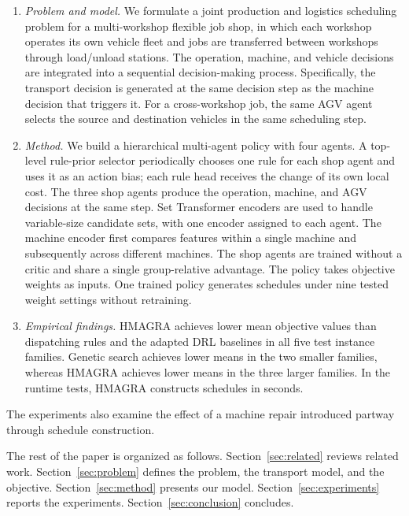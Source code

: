 \begin{enumerate}
\item \emph{Problem and model.} We formulate a joint production and logistics
scheduling problem for a multi-workshop flexible job shop, in which each
workshop operates its own vehicle fleet and jobs are transferred between
workshops through load/unload stations. The operation, machine, and vehicle
decisions are integrated into a sequential decision-making process.
Specifically, the transport decision is generated at the same decision step as
the machine decision that triggers it. For a cross-workshop job, the same AGV
agent selects the source and destination vehicles in the same scheduling step.

\item \emph{Method.} We build a hierarchical multi-agent policy with four
agents. A top-level rule-prior selector periodically chooses one rule for each
shop agent and uses it as an action bias; each rule head receives the change of
its own local cost. The three shop agents produce the operation, machine, and
AGV decisions at the same step. Set Transformer encoders are used to handle
variable-size candidate sets, with one encoder assigned to each agent. The
machine encoder first compares features within a single machine and
subsequently across different machines. The shop agents are trained without a
critic and share a single group-relative advantage. The policy takes objective weights as inputs. One trained policy generates
schedules under nine tested weight settings without retraining.

\item \emph{Empirical findings.} HMAGRA achieves lower mean objective values
than dispatching rules and the adapted DRL baselines in all five test
instance families. Genetic search achieves lower means in the two smaller
families, whereas HMAGRA achieves lower means in the three larger families.
In the runtime tests, HMAGRA constructs schedules in seconds.
\end{enumerate}

The experiments also examine the effect of a machine repair introduced
partway through schedule construction.

The rest of the paper is organized as follows. Section~\ref{sec:related}
reviews related work. Section~\ref{sec:problem} defines the problem,
the transport model, and the objective. Section~\ref{sec:method} presents our model. Section~\ref{sec:experiments} reports the experiments.
Section~\ref{sec:conclusion} concludes.
